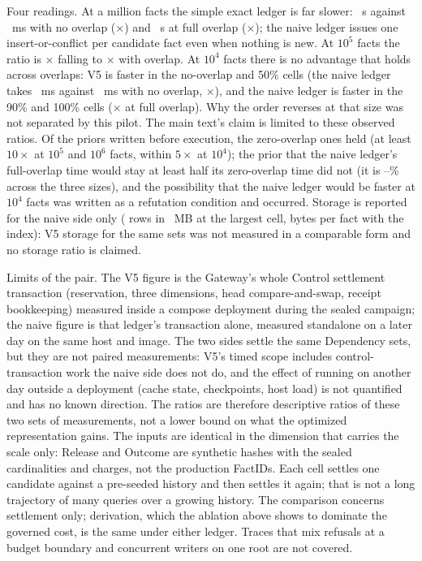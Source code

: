 \documentclass[journal,onecolumn]{IEEEtran}
\begin{document}
Four readings. At a million facts the simple exact ledger is far slower:
\NaiveScaleMillionZeroNaiveS{}~s against \NaiveScaleMillionZeroVFiveMS{}~ms
with no overlap (\NaiveScaleMillionZeroRatio{}$\times$) and
\NaiveScaleMillionFullNaiveS{}~s at full overlap
(\NaiveScaleMillionFullRatio{}$\times$); the naive ledger issues one
insert-or-conflict per candidate fact even when nothing is new. At $10^5$
facts the ratio is \NaiveScaleHundredKZeroRatio{}$\times$ falling to
\NaiveScaleHundredKFullRatio{}$\times$ with overlap. At $10^4$ facts there
is no advantage that holds across overlaps: V5 is faster in the no-overlap
and 50\% cells (the naive ledger takes \NaiveScaleTenKZeroNaiveMS{}~ms
against \NaiveScaleTenKZeroVFiveMS{}~ms with no overlap,
\NaiveScaleTenKZeroRatio{}$\times$), and the naive ledger is faster in the
90\% and 100\% cells (\NaiveScaleTenKFullRatio{}$\times$ at full overlap).
Why the order reverses at that size was not separated by this pilot. The
main text's claim is limited to these observed ratios. Of the priors written before execution, the zero-overlap ones
held (at least $10\times$ at $10^5$ and $10^6$ facts, within $5\times$ at
$10^4$); the prior that the naive ledger's full-overlap time would stay at
least half its zero-overlap time did not (it is
\NaiveScaleFullOverZeroPctMin{}--\NaiveScaleFullOverZeroPctMax{}\% across the
three sizes),
and the possibility that the naive ledger would be faster at $10^4$ facts
was written as a refutation condition and occurred. Storage is reported for
the naive side only (\NaiveScaleMillionZeroRows{} rows in
\NaiveScaleMillionZeroMB{}~MB at the largest cell,
\NaiveScaleBytesPerFact{} bytes per fact with the index): V5 storage for the
same sets was not measured in a comparable form and no storage ratio is
claimed.

Limits of the pair. The V5 figure is the Gateway's whole Control settlement
transaction (reservation, three dimensions, head compare-and-swap, receipt
bookkeeping) measured inside a compose deployment during the sealed campaign;
the naive figure is that ledger's transaction alone, measured standalone on a
later day on the same host and image. The two sides settle the same
Dependency sets, but they are not paired measurements: V5's timed scope
includes control-transaction work the naive side does not do, and the
effect of running on another day outside a deployment (cache state,
checkpoints, host load) is not quantified and has no known direction. The
ratios are therefore descriptive ratios of these two sets of measurements,
not a lower bound on what the optimized representation gains. The inputs
are identical in the dimension that carries the scale only: Release and
Outcome are synthetic hashes with the sealed cardinalities and charges, not
the production FactIDs. Each cell settles one candidate against a
pre-seeded history and then settles it again; that is not a long trajectory
of many queries over a growing history. The comparison concerns settlement
only; derivation, which the ablation above shows to dominate the governed
cost, is the same under either ledger. Traces that mix refusals at a budget
boundary and concurrent writers on one root are not covered.
\end{document}
